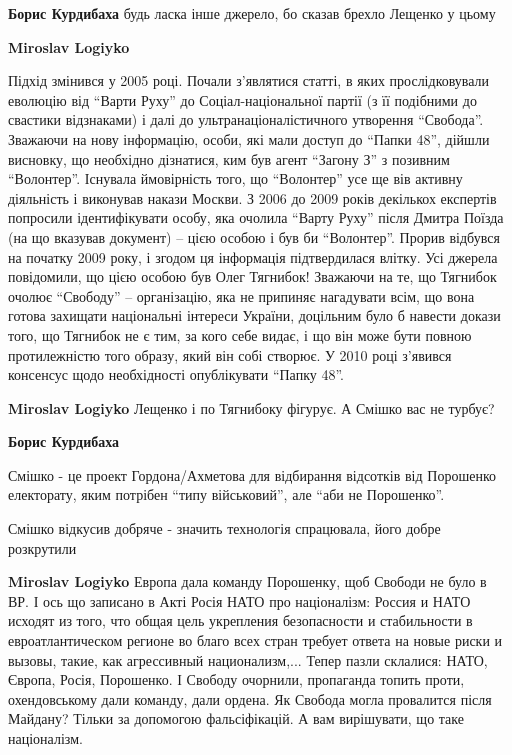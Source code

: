\begin{itemize}
\begin{itemize}
\begin{itemize}
\textbf{Борис Курдибаха} будь ласка інше джерело, бо сказав брехло Лещенко у цьому

\textbf{Miroslav Logiyko} 

Підхід змінився у 2005 році. Почали з'являтися статті, в яких прослідковували
еволюцію від \enquote{Варти Руху} до Соціал-національної партії (з її подібними
до свастики відзнаками) і далі до ультранаціоналістичного утворення
\enquote{Свобода}.  Зважаючи на нову інформацію, особи, які мали доступ до
\enquote{Папки 48}, дійшли висновку, що необхідно дізнатися, ким був агент
\enquote{Загону З} з позивним \enquote{Волонтер}. Існувала ймовірність того, що
\enquote{Волонтер} усе ще вів активну діяльність і виконував накази Москви. З
2006 до 2009 років декількох експертів попросили ідентифікувати особу, яка
очолила \enquote{Варту Руху} після Дмитра Поїзда (на що вказував документ) –
цією особою і був би \enquote{Волонтер}. Прорив відбувся на початку 2009 року,
і згодом ця інформація підтвердилася влітку. Усі джерела повідомили, що цією
особою був Олег Тягнибок! Зважаючи на те, що Тягнибок очолює \enquote{Свободу}
– організацію, яка не припиняє нагадувати всім, що вона готова захищати
національні інтереси України, доцільним було б навести докази того, що Тягнибок
не є тим, за кого себе видає, і що він може бути повною протилежністю того
образу, який він собі створює. У 2010 році з'явився консенсус щодо необхідності
опублікувати \enquote{Папку 48}.


\textbf{Miroslav Logiyko} Лещенко і по Тягнибоку фігурує. А Смішко вас не турбує?

\textbf{Борис Курдибаха} 

Смішко - це проект Гордона/Ахметова для відбирання відсотків від Порошенко
електорату, яким потрібен \enquote{типу військовий}, але \enquote{аби не Порошенко}.

Смішко відкусив добряче - значить технологія спрацювала, його добре розкрутили

\textbf{Miroslav Logiyko}
Европа дала команду Порошенку, щоб Свободи не було в ВР.
І ось що записано в Акті Росія НАТО про націоналізм:
Россия и НАТО исходят из того, что общая цель укрепления безопасности и стабильности в евроатлантическом регионе во благо всех стран требует ответа на новые риски и вызовы, такие, как агрессивный национализм,...
Тепер пазли склалися: НАТО, Європа, Росія, Порошенко. І Свободу очорнили, пропаганда топить проти, охендовському дали команду, дали ордена.
Як Свобода могла провалится після Майдану? Тільки за допомогою фальсіфікацій.
А вам вирішувати, що таке націоналізм.


\end{itemize}
\end{itemize}
\end{itemize}
